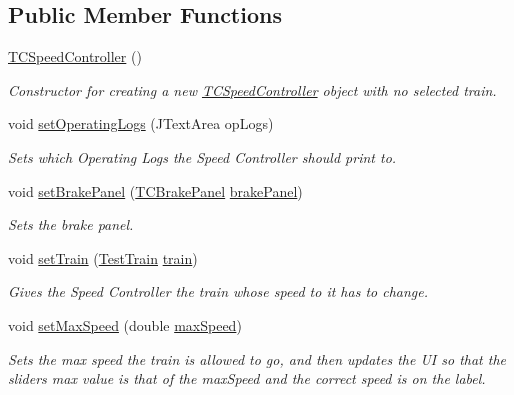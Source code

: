 \subsection*{Public Member Functions}
\begin{DoxyCompactItemize}
\item 
\hyperlink{classTrainControllerComps_1_1TCSpeedController_a2bf8141c881ab8a26b084813be33a200}{T\+C\+Speed\+Controller} ()
\begin{DoxyCompactList}\small\item\em Constructor for creating a new \hyperlink{classTrainControllerComps_1_1TCSpeedController}{T\+C\+Speed\+Controller} object with no selected train. \end{DoxyCompactList}\item 
void \hyperlink{classTrainControllerComps_1_1TCSpeedController_aa77cc92612065fb35630dc957e51d131}{set\+Operating\+Logs} (J\+Text\+Area op\+Logs)
\begin{DoxyCompactList}\small\item\em Sets which Operating Logs the Speed Controller should print to. \end{DoxyCompactList}\item 
void \hyperlink{classTrainControllerComps_1_1TCSpeedController_a986d53f2a607902b98706f9cde8d80b0}{set\+Brake\+Panel} (\hyperlink{classTrainControllerComps_1_1TCBrakePanel}{T\+C\+Brake\+Panel} \hyperlink{classTrainControllerComps_1_1TCSpeedController_a539321041f3ef8431e32bd9fa9238541}{brake\+Panel})
\begin{DoxyCompactList}\small\item\em Sets the brake panel. \end{DoxyCompactList}\item 
void \hyperlink{classTrainControllerComps_1_1TCSpeedController_a5f707ae153cba07e276eab9c7fff7136}{set\+Train} (\hyperlink{classTrainControllerComps_1_1TestTrain}{Test\+Train} \hyperlink{classtrain}{train})
\begin{DoxyCompactList}\small\item\em Gives the Speed Controller the train whose speed to it has to change. \end{DoxyCompactList}\item 
void \hyperlink{classTrainControllerComps_1_1TCSpeedController_aacfc193db3b550fe02839a55152573cb}{set\+Max\+Speed} (double \hyperlink{classTrainControllerComps_1_1TCSpeedController_abd22aed945ca95e2bd476cf9cc2abcbd}{max\+Speed})
\begin{DoxyCompactList}\small\item\em Sets the max speed the train is allowed to go, and then updates the UI so that the slider\textquotesingle{}s max value is that of the max\+Speed and the correct speed is on the label. \end{DoxyCompactList}\item 

\end{DoxyCompactItemize}
